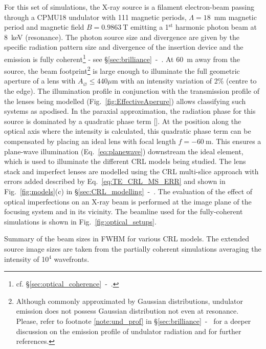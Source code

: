 \begin{refsection}
For this set of simulations, the X-ray source is a filament electron-beam passing through a CPMU18 undulator with 111 magnetic periods, $\Lambda=18$~mm magnetic period and magnetic field $B=0.9863~$T emitting a 1$^\text{st}$ harmonic photon beam at 8~keV (resonance). The photon source size and divergence are given by the specific radiation
pattern size and divergence of the insertion device and the emission is fully coherent\footnote{cf. \S\ref{sec:optical_coherence}~-~\textit{}.}  - see \S\ref{sec:brilliance}~-~\textit{}. At 60~m away from the source, the beam footprint\footnote{Although commonly approximated by Gaussian distributions, undulator emission does not possess Gaussian distribution not even at resonance. Please, refer to footnote \ref{note:und_prof} in \S\ref{sec:brilliance}~-~\textit{} for a deeper discussion on the emission profile of undulator radiation and for further references.} is large enough to illuminate the full geometric aperture of a lens with $A_{\diameter}\le440 \mu\text{m}$ with an intensity variation of 2\% (centre to the edge). The illumination profile in conjunction with the transmission profile of the lenses being modelled (Fig.~\ref{fig:EffectiveAperure}) allows classifying such systems as apodised. In the paraxial approximation, the radiation phase for this source is dominated by a quadratic phase term [\cite{Chubar1999, Chubar2001b, Chubar2019}]. At the position along the optical axis where the intensity is calculated, this quadratic phase term can be compensated by placing an ideal lens with focal length $f=-60~$m. This ensures a plane-wave illumination (Eq.~\ref{eq:planewave}) downstream the ideal element, which is used to illuminate the different CRL models being studied. The lens stack and imperfect lenses are modelled using the CRL multi-slice approach with errors added described by Eq.~\ref{eq:TE_CRL_MS_ERR} and shown in Fig.~\ref{fig:models}(c) in \S\ref{sec:CRL_modelling}~-~\textit{}. The evaluation of the effect of optical imperfections on an X-ray beam is performed at the image plane of the focusing system and in its vicinity. The beamline used for the fully-coherent simulations is shown in  Fig.~\ref{fig:optical_setups}.

\begin{table}[h]
\caption[FWHM of the PSF for the simulated models in Figs.~\ref{fig:CDn_vs_CDnStack}-\ref{fig:CDnS}]{Summary of the beam sizes in FWHM for various CRL models. The extended source image sizes are taken from the partially coherent simulations averaging the intensity of 10$^{4}$ wavefronts.}\label{tab:beamsizes}\small


\end{table}
\end{refsection}
